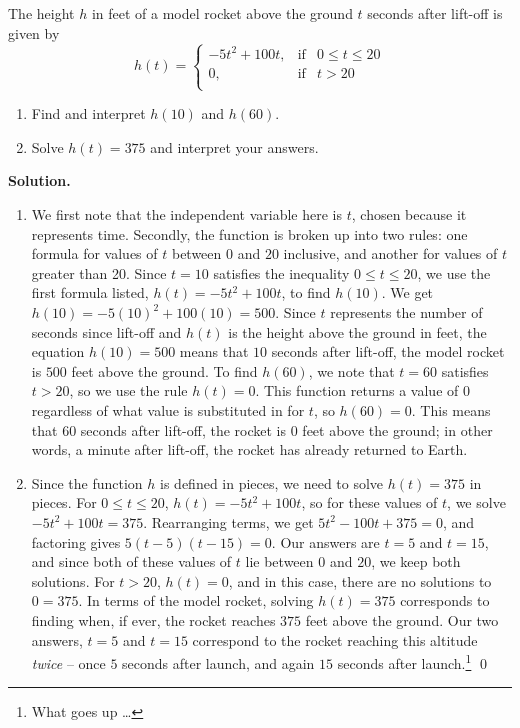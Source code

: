 \begin{ex} \label{heightofrocketmodel} The height $h$ in feet of a model rocket above the ground $t$ seconds after lift-off is given by \[ h(t) = \left\{ \begin{array}{rcl} -5t^2 + 100t, & \mbox{if} & 0 \leq t \leq 20 \\ 0, & \mbox{if} & t > 20 \\ \end{array} \right.\]

\begin{enumerate}

\item Find and interpret $h(10)$ and $h(60)$.

\item Solve $h(t) = 375$ and interpret your answers.

\end{enumerate}

{\bf Solution.} \begin{enumerate} \item We first note that the independent variable here is $t$, chosen because it represents time.  Secondly, the function is broken up into two rules:  one formula for values of $t$ between $0$ and $20$ inclusive, and another for values of $t$ greater than 20. Since $t=10$ satisfies the inequality $0 \leq t \leq 20$,  we use the first formula listed,  $h(t) = -5t^2 + 100t$, to find $h(10)$.  We get $h(10) = -5(10)^2 + 100(10) = 500$.  Since $t$ represents the number of seconds since lift-off and $h(t)$ is the height above the ground in feet, the equation $h(10) = 500$ means that $10$ seconds after lift-off, the model rocket is $500$ feet above the ground. To find $h(60)$, we note that $t=60$ satisfies $t > 20$, so we use the rule $h(t) = 0$.  This function returns a value of $0$ regardless of what value is substituted in for $t$, so $h(60) = 0$.  This means that $60$ seconds after lift-off, the rocket is $0$ feet above the ground;  in other words, a minute after lift-off, the rocket has already returned to Earth.

\item Since the function $h$ is defined in pieces, we need to solve $h(t) = 375$ in pieces.  For $0 \leq t \leq 20$, $h(t) =  -5t^2 + 100t$, so for these values of $t$, we solve $-5t^2 + 100t = 375$.  Rearranging terms, we get $5t^2 - 100t + 375 = 0$, and factoring gives $5(t-5)(t-15) = 0$. Our answers are  $t=5$ and $t=15$, and since both of these values of $t$ lie between $0$ and $20$, we keep both solutions.  For $t>20$, $h(t) = 0$, and in this case, there are no solutions to $0=375$.  In terms of the model rocket,  solving $h(t) = 375$ corresponds to finding when, if ever, the rocket reaches $375$ feet above the ground. Our two answers, $t=5$ and $t=15$ correspond to the rocket reaching this altitude \textit{twice} -- once $5$ seconds after launch, and again $15$ seconds after launch.\footnote{What goes up \ldots} \qed


\end{enumerate}

\end{ex}

